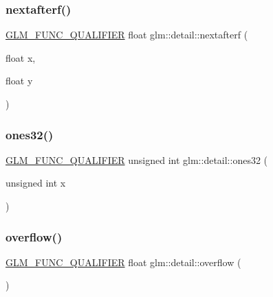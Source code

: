 \mbox{\label{namespaceglm_1_1detail_ab0eb795c482130b1d6c83470bdb031e6}} 
\subsubsection{\texorpdfstring{nextafterf()}{nextafterf()}}
{\footnotesize\ttfamily \mbox{\hyperlink{setup_8hpp_a33fdea6f91c5f834105f7415e2a64407}{G\+L\+M\+\_\+\+F\+U\+N\+C\+\_\+\+Q\+U\+A\+L\+I\+F\+I\+ER}} float glm\+::detail\+::nextafterf (\begin{DoxyParamCaption}\item[{float}]{x,  }\item[{float}]{y }\end{DoxyParamCaption})}

\mbox{\label{namespaceglm_1_1detail_a2699e3b3ea6ad8d4bb99aed56761582c}} 
\subsubsection{\texorpdfstring{ones32()}{ones32()}}
{\footnotesize\ttfamily \mbox{\hyperlink{setup_8hpp_a33fdea6f91c5f834105f7415e2a64407}{G\+L\+M\+\_\+\+F\+U\+N\+C\+\_\+\+Q\+U\+A\+L\+I\+F\+I\+ER}} unsigned int glm\+::detail\+::ones32 (\begin{DoxyParamCaption}\item[{unsigned int}]{x }\end{DoxyParamCaption})}

\mbox{\label{namespaceglm_1_1detail_a61efe122333bc00e81c57e0927bfdfb3}} 
\subsubsection{\texorpdfstring{overflow()}{overflow()}}
{\footnotesize\ttfamily \mbox{\hyperlink{setup_8hpp_a33fdea6f91c5f834105f7415e2a64407}{G\+L\+M\+\_\+\+F\+U\+N\+C\+\_\+\+Q\+U\+A\+L\+I\+F\+I\+ER}} float glm\+::detail\+::overflow (\begin{DoxyParamCaption}{ }\end{DoxyParamCaption})}

